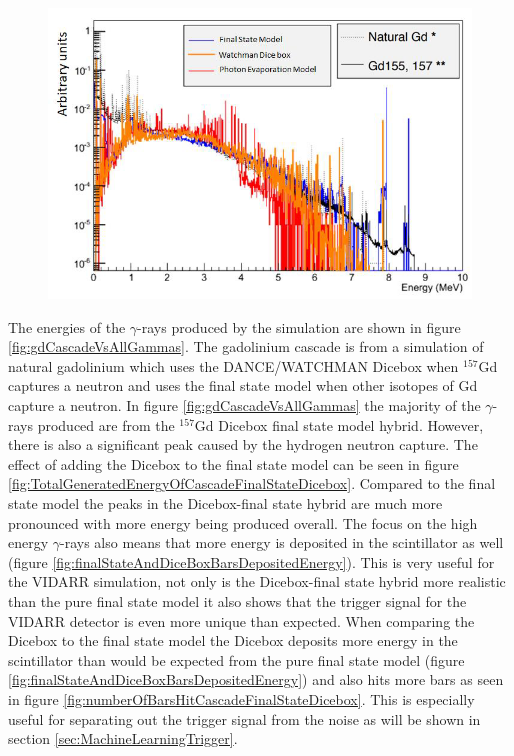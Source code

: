 \begin{figure}[!h]
 \centering
 \includegraphics[width=0.7\linewidth]{Chapter4/Figs/Raster/gadolinium/comparisonAndDiceBoxGd.png}
 \label{fig:comparisonAndDiceBoxGd}
\end{figure}

The energies of the $\gamma$-rays produced by the simulation are shown in figure \ref{fig:gdCascadeVsAllGammas}. The gadolinium cascade is from a simulation of natural gadolinium which uses the DANCE/WATCHMAN Dicebox when $^{157}$Gd captures a neutron and uses the final state model when other isotopes of Gd capture a neutron. In figure \ref{fig:gdCascadeVsAllGammas} the majority of the $\gamma$-rays produced are from the $^{157}$Gd Dicebox final state model hybrid. However, there is also a significant peak caused by the hydrogen neutron capture. The effect of adding the Dicebox to the final state model can be seen in figure \ref{fig:TotalGeneratedEnergyOfCascadeFinalStateDicebox}. Compared to the final state model the peaks in the Dicebox-final state hybrid are much more pronounced with more energy being produced overall. The focus on the high energy $\gamma$-rays also means that more energy is deposited in the scintillator as well (figure \ref{fig:finalStateAndDiceBoxBarsDepositedEnergy}). This is very useful for the VIDARR simulation, not only is the Dicebox-final state hybrid more realistic than the pure final state model it also shows that the trigger signal for the VIDARR detector is even more unique than expected. When comparing the Dicebox to the final state model the Dicebox deposits more energy in the scintillator than would be expected from the pure final state model (figure \ref{fig:finalStateAndDiceBoxBarsDepositedEnergy}) and also hits more bars as seen in figure \ref{fig:numberOfBarsHitCascadeFinalStateDicebox}. This is especially useful for separating out the trigger signal from the noise as will be shown in section \ref{sec:MachineLearningTrigger}.

